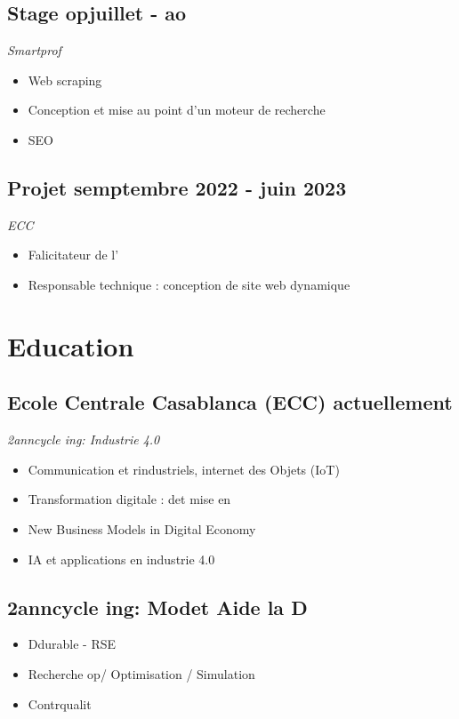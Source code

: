 \documentclass[a4paper,10pt]{article}
\begin{document}
\begin{multicols}{2}
\subsection*{Stage op\ufffdrateur \hfill juillet - ao}
\textit{Smartprof}
\begin{itemize}
    \item Web scraping
    \item Conception et mise au point d'un moteur de recherche
    \item SEO
\end{itemize}

\subsection*{Projet \ufffdSmartRamp\ufffd \hfill semptembre 2022 - juin 2023}
\textit{ECC}
\begin{itemize}
    \item Falicitateur de l'\ufffdquipe
    \item Responsable technique : conception de site web dynamique
\end{itemize}

\pagebreak

\section*{ Education}

\subsection*{Ecole Centrale Casablanca (ECC) \hfill actuellement}
\textit{2\ufffdme ann\ufffde cycle ing\ufffdnieur : Industrie 4.0}
\begin{itemize}
    \item Communication et r\ufffdseaux industriels, internet des Objets (IoT)
    \item Transformation digitale : d\ufffdmarches et mise en \ufffduvre
    \item New Business Models in Digital Economy
    \item IA et applications en industrie 4.0
\end{itemize}

\subsection*{2\ufffdme ann\ufffde cycle ing\ufffdnieur : Mod\ufffdlisation et Aide \ufffd la D\ufffdcision}
\begin{itemize}
    \item D\ufffdveloppement durable - RSE
    \item Recherche op\ufffdrationnelle / Optimisation / Simulation
    \item Contr\ufffdle qualit\ufffd
\end{itemize}


\end{multicols}
\end{document}
